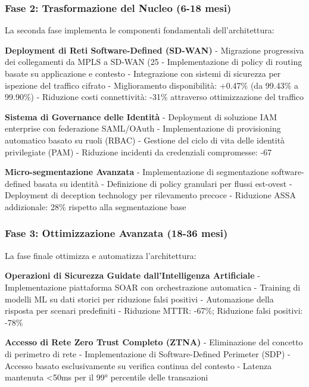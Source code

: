 \subsubsection{\texorpdfstring{\textbf{Fase 2: Trasformazione del Nucleo (6-18 mesi)}}{2.6.1.2 - Fase 2: Trasformazione del Nucleo (6-18 mesi)}}

La seconda fase implementa le componenti fondamentali dell'architettura:

\textbf{Deployment di Reti Software-Defined (SD-WAN)}
- Migrazione progressiva dei collegamenti da MPLS a SD-WAN (25%
- Implementazione di policy di routing basate su applicazione e contesto
- Integrazione con sistemi di sicurezza per ispezione del traffico cifrato
- Miglioramento disponibilità: +0.47\% (da 99.43\% a 99.90\%)
- Riduzione costi connettività: -31\% attraverso ottimizzazione del traffico

\textbf{Sistema di Governance delle Identità}
- Deployment di soluzione IAM enterprise con federazione SAML/OAuth
- Implementazione di provisioning automatico basato su ruoli (RBAC)
- Gestione del ciclo di vita delle identità privilegiate (PAM)
- Riduzione incidenti da credenziali compromesse: -67%

\textbf{Micro-segmentazione Avanzata}
- Implementazione di segmentazione software-defined basata su identità
- Definizione di policy granulari per flussi est-ovest
- Deployment di deception technology per rilevamento precoce
- Riduzione ASSA addizionale: 28\% rispetto alla segmentazione base

\subsubsection{\texorpdfstring{\textbf{Fase 3: Ottimizzazione Avanzata (18-36 mesi)}}{2.6.1.3 - Fase 3: Ottimizzazione Avanzata (18-36 mesi)}}

La fase finale ottimizza e automatizza l'architettura:

\textbf{Operazioni di Sicurezza Guidate dall'Intelligenza Artificiale}
- Implementazione piattaforma SOAR con orchestrazione automatica
- Training di modelli ML su dati storici per riduzione falsi positivi
- Automazione della risposta per scenari predefiniti
- Riduzione MTTR: -67\%; Riduzione falsi positivi: -78\%

\textbf{Accesso di Rete Zero Trust Completo (ZTNA)}
- Eliminazione del concetto di perimetro di rete
- Implementazione di Software-Defined Perimeter (SDP)
- Accesso basato esclusivamente su verifica continua del contesto
- Latenza mantenuta <50ms per il 99° percentile delle transazioni

